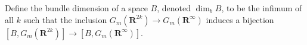 Define the bundle dimension of a space $B$, denoted $\dim_b B$, to be the infimum of all $k$ such that the inclusion $G_m(\mathbf{R}^{2k}) \rightarrow G_m(\mathbf{R}^{\infty})$ induces a bijection $[B, G_m(\mathbf{R}^{2k})] \rightarrow [B, G_m(\mathbf{R}^{\infty})]$.